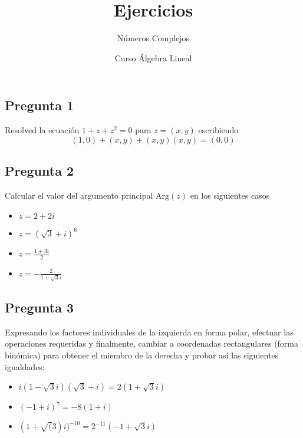 \documentclass[
]{article}
\title{Ejercicios}
\subtitle{Números Complejos}
\author{Curso Álgebra Lineal}
\date{}
\providecommand{\tightlist}{%
  \setlength{\itemsep}{0pt}\setlength{\parskip}{0pt}}
\begin{document}
\maketitle

\subsection{Pregunta 1}\label{pregunta-1}

Resolved la ecuación \(1+z+z^2=0\) para \(z=(x,y)\) escribiendo
\[(1,0)+(x,y)+(x,y)(x,y) = (0,0)\]

\subsection{Pregunta 2}\label{pregunta-2}

Calcular el valor del argumento principal \(\text{Arg}(z)\) en los
siguientes casos

\begin{itemize}
\tightlist
\item
  \(z = 2+2i\)
\item
  \(z = (\sqrt{3}+i)^6\)
\item
  \(z = \frac{1+3i}{2}\)
\item
  \(z = -\frac{2}{1+\sqrt{3}i}\)
\end{itemize}

\subsection{Pregunta 3}\label{pregunta-3}

Expresando los factores individuales de la izquierda en forma polar,
efectuar las operaciones requeridas y finalmente, cambiar a coordenadas
rectangulares (forma binómica) para obtener el miembro de la derecha y
probar así las siguientes igualdades:

\begin{itemize}
\tightlist
\item
  \(i(1-\sqrt{3}i)(\sqrt{3}+i) = 2(1+\sqrt{3}i)\)
\item
  \((-1+i)^7 = -8(1+i)\)
\item
  \((1+\sqrt(3)i)^{-10} = 2^{-11}(-1+\sqrt{3}i)\)
\end{itemize}
\end{document}
